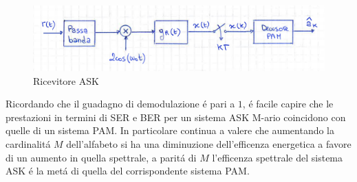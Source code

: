         \begin{figure}[H]
            \centering
            \includegraphics[width = 12cm]{media/ricevitore ask.png}
            \caption{Ricevitore ASK}
        \end{figure}
        Ricordando che il guadagno di demodulazione é pari a $1$, é facile capire che le prestazioni in termini di SER e BER per un sistema ASK
        M-ario coincidono con quelle di un sistema PAM. In particolare continua a valere che aumentando la cardinalitá $M$ dell'alfabeto 
        si ha una diminuzione dell'efficenza energetica a favore di un aumento in quella spettrale, a paritá di $M$ l'efficenza 
        spettrale del sistema ASK é la metá di quella del corrispondente sistema PAM. 
